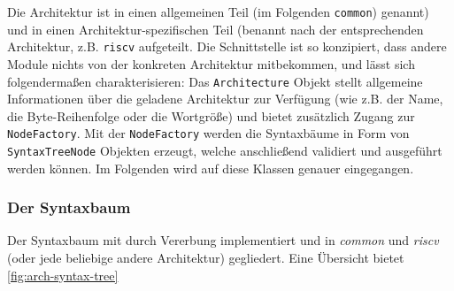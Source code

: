 Die Architektur ist in einen allgemeinen Teil (im Folgenden \texttt{common})
genannt) und in einen Architektur-spezifischen Teil (benannt nach der
entsprechenden Architektur, z.B. \texttt{riscv} aufgeteilt. Die Schnittstelle
ist so konzipiert, dass andere Module nichts von der konkreten Architektur
mitbekommen, und lässt sich folgendermaßen charakterisieren: Das
\texttt{Architecture} Objekt stellt allgemeine Informationen über die geladene
Architektur zur Verfügung (wie z.B. der Name, die Byte-Reihenfolge oder die
Wortgröße) und bietet zusätzlich Zugang zur \texttt{NodeFactory}. Mit der
\texttt{NodeFactory} werden die Syntaxbäume in Form von \texttt{SyntaxTreeNode}
Objekten erzeugt, welche anschließend validiert und ausgeführt werden können. Im
Folgenden wird auf diese Klassen genauer eingegangen.





\subsubsection{Der Syntaxbaum}

Der Syntaxbaum mit durch Vererbung implementiert und in \emph{common} und
\emph{riscv} (oder jede beliebige andere Architektur) gegliedert. Eine
Übersicht bietet \autoref{fig:arch-syntax-tree}

